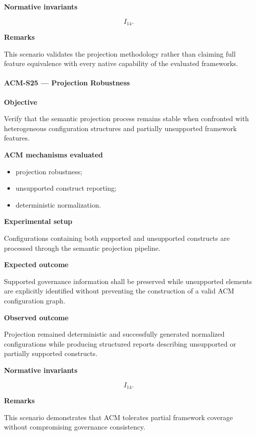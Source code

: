 \documentclass[10pt]{article}
\begin{document}
\textbf{Normative invariants}

\[
I_{14}.
\]

\textbf{Remarks}

This scenario validates the projection methodology rather than claiming full
feature equivalence with every native capability of the evaluated frameworks.

\paragraph{ACM-S25 --- Projection Robustness}

\textbf{Objective}

Verify that the semantic projection process remains stable when confronted with
heterogeneous configuration structures and partially unsupported framework
features.

\textbf{ACM mechanisms evaluated}

\begin{itemize}
    \item projection robustness;
    \item unsupported construct reporting;
    \item deterministic normalization.
\end{itemize}

\textbf{Experimental setup}

Configurations containing both supported and unsupported constructs are
processed through the semantic projection pipeline.

\textbf{Expected outcome}

Supported governance information shall be preserved while unsupported elements
are explicitly identified without preventing the construction of a valid ACM
configuration graph.

\textbf{Observed outcome}

Projection remained deterministic and successfully generated normalized
configurations while producing structured reports describing unsupported or
partially supported constructs.

\textbf{Normative invariants}

\[
I_{14}.
\]

\textbf{Remarks}

This scenario demonstrates that ACM tolerates partial framework coverage
without compromising governance consistency.

\end{document}
